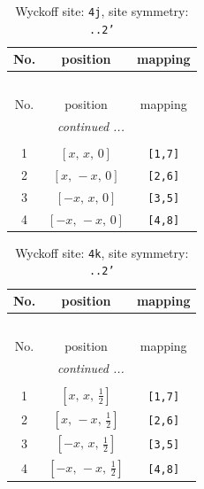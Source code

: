\documentclass[fleqn,8pt]{jsarticle}
\begin{document}
\begin{longtable}{ccc}
\caption{Wyckoff site: {\tt 4j}, site symmetry: {\tt ..2'}}
 \\
 \hline \hline
No. & position & mapping \\ \hline \endfirsthead

\multicolumn{2}{l}{\tablename\ \thetable{}} \\
 \hline \hline
No. & position & mapping \\ \hline \endhead

 \hline \hline
\multicolumn{2}{r}{\footnotesize\it continued ...} \\ \endfoot

 \hline \hline
\multicolumn{2}{r}{} \\ \endlastfoot

1 & $\left[ x,\, x,\, 0 \right]$ & {\tt [1,7]} \\ \hline
2 & $\left[ x,\, - x,\, 0 \right]$ & {\tt [2,6]} \\ \hline
3 & $\left[ - x,\, x,\, 0 \right]$ & {\tt [3,5]} \\ \hline
4 & $\left[ - x,\, - x,\, 0 \right]$ & {\tt [4,8]} \\
\end{longtable}
\renewcommand{\arraystretch}{1.2}
\begin{longtable}{ccc}
\caption{Wyckoff site: {\tt 4k}, site symmetry: {\tt ..2'}}
 \\
 \hline \hline
No. & position & mapping \\ \hline \endfirsthead

\multicolumn{2}{l}{\tablename\ \thetable{}} \\
 \hline \hline
No. & position & mapping \\ \hline \endhead

 \hline \hline
\multicolumn{2}{r}{\footnotesize\it continued ...} \\ \endfoot

 \hline \hline
\multicolumn{2}{r}{} \\ \endlastfoot

1 & $\left[ x,\, x,\, \frac{1}{2} \right]$ & {\tt [1,7]} \\ \hline
2 & $\left[ x,\, - x,\, \frac{1}{2} \right]$ & {\tt [2,6]} \\ \hline
3 & $\left[ - x,\, x,\, \frac{1}{2} \right]$ & {\tt [3,5]} \\ \hline
4 & $\left[ - x,\, - x,\, \frac{1}{2} \right]$ & {\tt [4,8]} \\
\end{longtable}
\end{document}
